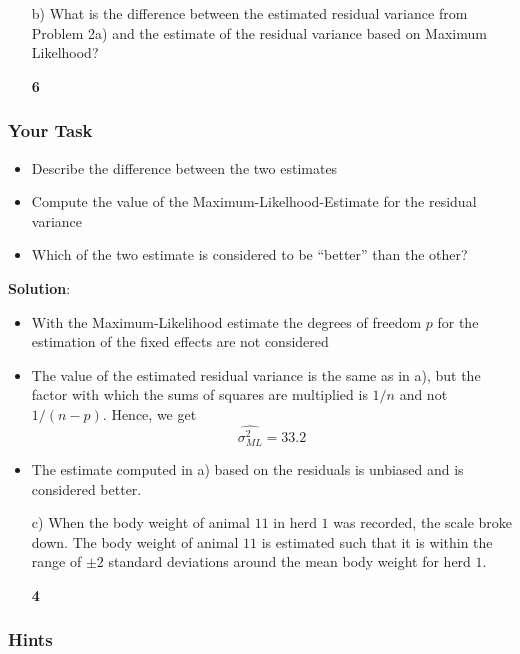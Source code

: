 \documentclass[]{article}
\providecommand{\tightlist}{%
  \setlength{\itemsep}{0pt}\setlength{\parskip}{0pt}}
\newcommand{\points}[1]
{\begin{flushright}\textbf{#1}\end{flushright}}
\newcommand{\sol}
{\vspace{2ex}\textbf{Solution}:}
\begin{document}
\clearpage
\pagebreak

\begin{enumerate}
\item[b)] What is the difference between the estimated residual variance from Problem 2a) and the estimate of the residual variance based on Maximum Likelhood? 
\points{6}
\end{enumerate}

\subsubsection{Your Task}\label{your-task-1}

\begin{itemize}
\tightlist
\item
  Describe the difference between the two estimates
\item
  Compute the value of the Maximum-Likelhood-Estimate for the residual
  variance
\item
  Which of the two estimate is considered to be ``better'' than the
  other?
\end{itemize}

\sol

\begin{itemize}
\tightlist
\item
  With the Maximum-Likelihood estimate the degrees of freedom \(p\) for
  the estimation of the fixed effects are not considered
\item
  The value of the estimated residual variance is the same as in a), but
  the factor with which the sums of squares are multiplied is \(1/n\)
  and not \(1/(n-p)\). Hence, we get \[\widehat{\sigma^2_{ML}} = 33.2\]
\item
  The estimate computed in a) based on the residuals is unbiased and is
  considered better.
\end{itemize}

\clearpage
\pagebreak

\begin{enumerate}
\item[c)] When the body weight of animal $11$ in herd $1$ was recorded, the scale broke down.  The body weight of animal $11$ is estimated such that it is within the range of $\pm 2$ standard deviations around the mean body weight for herd $1$. 
\points{4}
\end{enumerate}

\subsubsection{Hints}\label{hints}
\end{document}
